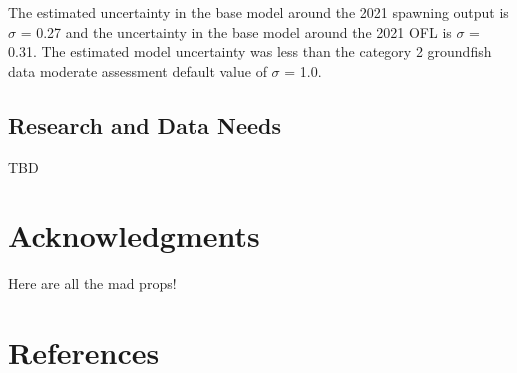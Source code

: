 \documentclass[11pt,
  english,
  a4paper,
]{article}
\begin{document}

The estimated uncertainty in the base model around the 2021 spawning output is {\(\sigma\)\leavevmode\tagmcend\tagstructend} = 0.27 and the uncertainty in the base model around the 2021 OFL is {\(\sigma\)\leavevmode\tagmcend\tagstructend} = 0.31. The estimated model uncertainty was less than the category 2 groundfish data moderate assessment default value of {\(\sigma\)\leavevmode\tagmcend\tagstructend} = 1.0.

\leavevmode\tagmcend\tagstructend\par


\hypertarget{research-and-data-needs-1}{%
\subsection{Research and Data Needs}\label{research-and-data-needs-1}}

\leavevmode\tagmcend\tagstructend


TBD

\leavevmode\tagmcend\tagstructend\par


\hypertarget{acknowledgments}{%
\section{Acknowledgments}\label{acknowledgments}}

\leavevmode\tagmcend\tagstructend


Here are all the mad props!

\leavevmode\tagmcend\tagstructend\par

\clearpage


\hypertarget{references}{%
\section{References}\label{references}}
\end{document}
